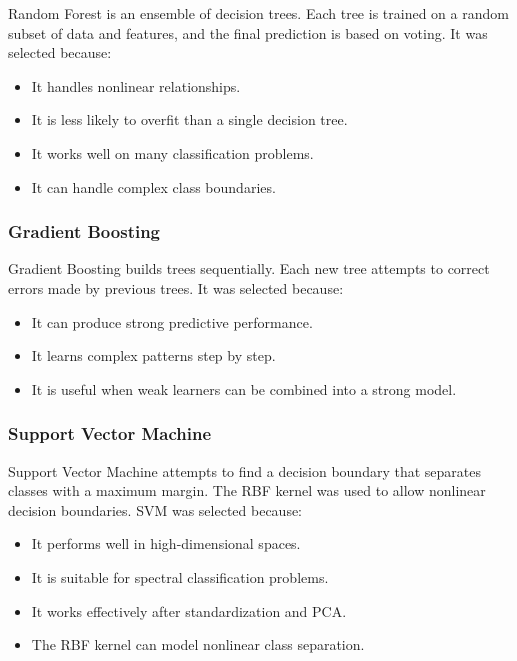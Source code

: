 \documentclass[12pt,a4paper]{article}
\begin{document}
Random Forest is an ensemble of decision trees. Each tree is trained on a random subset of data and features, and the final prediction is based on voting. It was selected because:

\begin{itemize}
    \item It handles nonlinear relationships.
    \item It is less likely to overfit than a single decision tree.
    \item It works well on many classification problems.
    \item It can handle complex class boundaries.
\end{itemize}

\subsubsection{Gradient Boosting}

Gradient Boosting builds trees sequentially. Each new tree attempts to correct errors made by previous trees. It was selected because:

\begin{itemize}
    \item It can produce strong predictive performance.
    \item It learns complex patterns step by step.
    \item It is useful when weak learners can be combined into a strong model.
\end{itemize}

\subsubsection{Support Vector Machine}

Support Vector Machine attempts to find a decision boundary that separates classes with a maximum margin. The RBF kernel was used to allow nonlinear decision boundaries. SVM was selected because:

\begin{itemize}
    \item It performs well in high-dimensional spaces.
    \item It is suitable for spectral classification problems.
    \item It works effectively after standardization and PCA.
    \item The RBF kernel can model nonlinear class separation.
\end{itemize}
\end{document}
